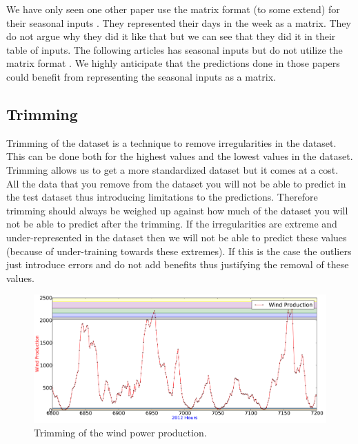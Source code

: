 We have only seen one other paper use the matrix format (to some extend) for their seasonal inputs \cite{crowley2005weather}. They represented their days in the week as a matrix. They do not argue why they did it like that but we can see that they did it in their table of inputs. The following articles has seasonal inputs but do not utilize the matrix format \cite{szkuta1999electricity, singhal2011electricity}. We highly anticipate that the predictions done in those papers could benefit from representing the seasonal inputs as a matrix. 

\subsection{Trimming}
Trimming of the dataset is a technique to remove irregularities in the dataset. This can be done both for the highest values and the lowest values in the dataset. Trimming allows us to get a more standardized dataset but it comes at a cost. All the data that you remove from the dataset you will not be able to predict in the test dataset thus introducing limitations to the predictions. Therefore trimming should always be weighed up against how much of the dataset you will not be able to predict after the trimming. If the irregularities are extreme and under-represented in the dataset then we will not be able to predict these values (because of under-training towards these extremes). If this is the case the outliers just introduce errors and do not add benefits thus justifying the removal of these values.

\begin{figure}[H]
\centering
\includegraphics[width=0.99\linewidth]{billeder/pointingOutPlaceWhereTrim.png}
\caption{Trimming of the wind power production.}
\label{fig:pointingOutPlaceWhereTrim}
\end{figure}

